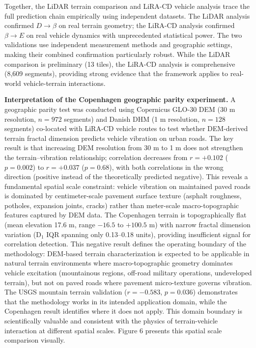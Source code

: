 \documentclass[11pt,letterpaper]{article}
\begin{document}
Together, the LiDAR terrain comparison and LiRA-CD vehicle analysis trace the full prediction chain empirically using independent datasets. The LiDAR analysis confirmed $D \rightarrow \beta$ on real terrain geometry; the LiRA-CD analysis confirmed $\beta \rightarrow E$ on real vehicle dynamics with unprecedented statistical power. The two validations use independent measurement methods and geographic settings, making their combined confirmation particularly robust. While the LiDAR comparison is preliminary (13 tiles), the LiRA-CD analysis is comprehensive (8,609 segments), providing strong evidence that the framework applies to real-world vehicle-terrain interactions.

\textbf{Interpretation of the Copenhagen geographic parity experiment.} A geographic parity test was conducted using Copernicus GLO-30 DEM (30 m resolution, $n=972$ segments) and Danish DHM (1 m resolution, $n=128$ segments) co-located with LiRA-CD vehicle routes to test whether DEM-derived terrain fractal dimension predicts vehicle vibration on urban roads. The key result is that increasing DEM resolution from 30 m to 1 m does not strengthen the terrain--vibration relationship; correlation decreases from $r = +0.102$ ($p = 0.002$) to $r = +0.037$ ($p = 0.68$), with both correlations in the wrong direction (positive instead of the theoretically predicted negative). This reveals a fundamental spatial scale constraint: vehicle vibration on maintained paved roads is dominated by centimeter-scale pavement surface texture (asphalt roughness, potholes, expansion joints, cracks) rather than meter-scale macro-topographic features captured by DEM data. The Copenhagen terrain is topographically flat (mean elevation 17.6 m, range $-16.5$ to $+100.5$ m) with narrow fractal dimension variation (D$_1$ IQR spanning only 0.13--0.18 units), providing insufficient signal for correlation detection. This negative result defines the operating boundary of the methodology: DEM-based terrain characterization is expected to be applicable in natural terrain environments where macro-topographic geometry dominates vehicle excitation (mountainous regions, off-road military operations, undeveloped terrain), but not on paved roads where pavement micro-texture governs vibration. The USGS mountain terrain validation ($r = -0.583$, $p = 0.036$) demonstrates that the methodology works in its intended application domain, while the Copenhagen result identifies where it does not apply. This domain boundary is scientifically valuable and consistent with the physics of terrain-vehicle interaction at different spatial scales. Figure 6 presents this spatial scale comparison visually.
\end{document}
